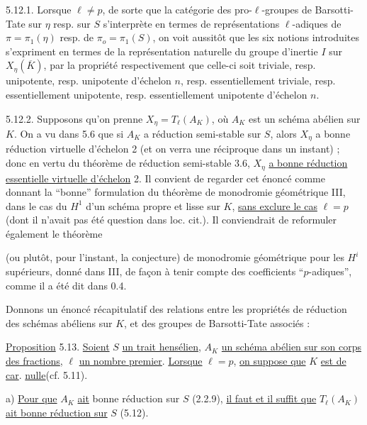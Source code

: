 5.12.1.  Lorsque $\ell \neq p$, de sorte que la catégorie des pro-$\ell$-groupes de Barsotti-Tate sur $\eta$ resp. sur $S$ s'interprète en termes de représentations $\ell$-adiques de $\pi = \pi_1(\eta)$ resp. de $\pi_o = \pi_1(S)$, on voit aussitôt que les six notions introduites s'expriment en termes de la représentation naturelle du groupe d'inertie $I$ sur $X_\eta(\overline{K})$, par la propriété respectivement que celle-ci soit triviale, resp. unipotente, resp. unipotente d'échelon $n$, resp. essentiellement triviale, resp. essentiellement unipotente, resp. essentiellement unipotente d'échelon $n$.

5.12.2.  Supposons qu'on prenne $X_\eta = T_\ell(A_K)$, où $A_K$ est un schéma abélien sur $K$. On a vu dans 5.6 que si $A_K$ a réduction semi-stable sur $S$, alors $X_\eta$ a bonne réduction virtuelle d'échelon 2 (et on verra une réciproque dans un instant) ; donc en vertu du théorème de réduction semi-stable 3.6, $X_\eta$ \underline{a bonne réduction essentielle virtuelle d'échelon} 2. Il convient de regarder cet énoncé comme donnant la ``bonne'' formulation du théorème de monodromie géométrique III\hspace{2em}, dans le cas du $H^1$ d'un schéma propre et lisse sur $K$, \underline{sans exclure le cas} $\ell = p$ (dont il n'avait pas été question dans loc. cit.). Il conviendrait de reformuler également le théorème



(ou plutôt, pour l'instant, la conjecture) de monodromie géométrique pour les $H^i$ supérieurs, donné dans III\hspace{2em}, de façon à tenir compte des coefficients ``$p$-adiques'', comme il a été dit dans 0.4.

Donnons un énoncé récapitulatif des relations entre les propriétés de réduction des schémas abéliens sur $K$, et des groupes de Barsotti-Tate associés :

\underline{Proposition} 5.13.  \underline{Soient} $S$ \underline{un trait hensélien}, $A_K$ \underline{un schéma abélien sur son corps des fractions}, $\ell$ \underline{un nombre premier}. \underline{Lorsque} $\ell = p$, \underline{on suppose que} $K$ \underline{est de car}. \underline{nulle}(cf. 5.11).

a) \underline{Pour que} $A_K$ \underline{ait} bonne réduction sur $S$ (2.2.9), \underline{il faut et il suffit que} $T_\ell(A_K)$ \underline{ait bonne réduction sur} $S$ (5.12).

